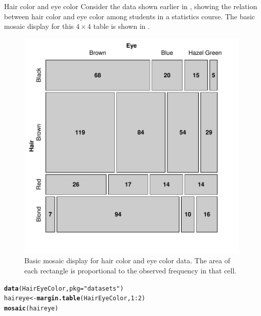 \documentclass[11pt]{book}\usepackage[]{graphicx}\usepackage[]{color}
\makeatletter
\newcommand{\hlnum}[1]{\textcolor[rgb]{0.686,0.059,0.569}{#1}}%
\newcommand{\hlstr}[1]{\textcolor[rgb]{0.192,0.494,0.8}{#1}}%
\newcommand{\hlopt}[1]{\textcolor[rgb]{0,0,0}{#1}}%
\newcommand{\hlstd}[1]{\textcolor[rgb]{0.345,0.345,0.345}{#1}}%
\newcommand{\hlkwb}[1]{\textcolor[rgb]{0.69,0.353,0.396}{#1}}%
\newcommand{\hlkwc}[1]{\textcolor[rgb]{0.333,0.667,0.333}{#1}}%
\newcommand{\hlkwd}[1]{\textcolor[rgb]{0.737,0.353,0.396}{\textbf{#1}}}%
\newenvironment{kframe}{%
 \def\at@end@of@kframe{}%
 \ifinner\ifhmode%
  \def\at@end@of@kframe{\end{minipage}}%
  \begin{minipage}{\columnwidth}%
 \fi\fi%
 \def\FrameCommand##1{\hskip\@totalleftmargin \hskip-\fboxsep
 \colorbox{shadecolor}{##1}\hskip-\fboxsep
     \hskip-\linewidth \hskip-\@totalleftmargin \hskip\columnwidth}%
 \MakeFramed {\advance\hsize-\width
   \@totalleftmargin\z@ \linewidth\hsize
   \@setminipage}}%
 {\par\unskip\endMakeFramed%
 \at@end@of@kframe}
\newenvironment{knitrout}{}{} %
\renewenvironment{knitrout}{\small\renewcommand{\baselinestretch}{.85}}{} %
\makeatother
\begin{document}
\begin{Example}[haireye2a]{Hair color and eye color}
Consider the data shown earlier in  ,
showing the relation between hair color and eye color among students
in a statistics course.  The basic mosaic display for this $4 \times 4$
table is shown in .

\begin{knitrout}
\color{fgcolor}\begin{figure}[htbp]


\centerline{\includegraphics[width=.6\textwidth]{ch05/fig/haireye-mos1} }

\caption[Basic mosaic display for hair color and eye color data]{Basic mosaic display for hair color and eye color data.  The area of each rectangle is proportional to the observed frequency in that cell.\label{fig:haireye-mos1}}
\end{figure}


\end{knitrout}


\begin{knitrout}
\color{fgcolor}\begin{kframe}
\begin{alltt}
\hlkwd{data}\hlstd{(HairEyeColor,} \hlkwc{pkg}\hlstd{=}\hlstr{"datasets"}\hlstd{)}
\hlstd{haireye} \hlkwb{<-} \hlkwd{margin.table}\hlstd{(HairEyeColor,} \hlnum{1}\hlopt{:}\hlnum{2}\hlstd{)}
\hlkwd{mosaic}\hlstd{(haireye)}
\end{alltt}
\end{kframe}
\end{knitrout}



\end{Example}
\end{document}
